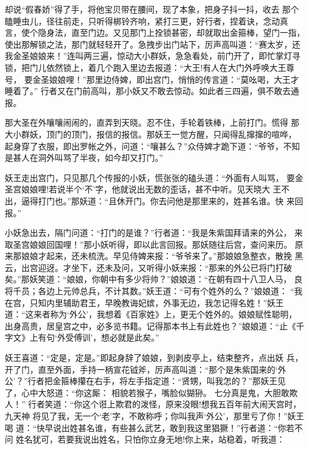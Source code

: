却说“假春娇”得了手，将他宝贝带在腰间，现了本象，把身子抖一抖，收去
那个瞌睡虫儿，径往前走，只听得梆铃齐响，紧打三更，好行者，捏着诀，念动真
言，使个隐身法，直至门边。又见那门上拴锁甚密，却就取出金箍棒，望门一指，
使出那解锁之法，那门就轻轻开了。急拽步出门站下，厉声高叫道：“赛太岁，还
我金圣娘娘来！”连叫两三遍，惊动大小群妖，急急看处，前门开了，即忙掌灯寻
锁，把门儿依然锁上，着几个跑入里边去报道：“大王!有人在大门外呼唤大王尊号，
要金圣娘娘哩！”那里边侍婢，即出宫门，悄悄的传言道：“莫吆喝，大王才睡着了。”
行者又在门前高叫，那小妖又不敢去惊动。如此者三四遍，俱不敢去通报。

那大圣在外嚷嚷闹闹的，直弄到天晓。忍不住，手轮着铁棒，上前打门。慌得
那大小群妖，顶门的顶门，报信的报信。那妖王一觉方醒，只闻得乱撺撺的喧哗，
起身穿了衣服，即出罗帐之外，问道：“嚷甚么？”众侍婢才跪下道：“爷爷，不知
是甚人在洞外叫骂了半夜，如今却又打门。”

妖王走出宫门，只见那几个传报的小妖，慌张张的磕头道：“外面有人叫骂，
要金圣宫娘娘哩!若说半个‘不’字，他就说出无数的歪话，甚不中听。见天晓大
王不出，逼得打门也。”那妖道：“且休开门。你去问他是那里来的，姓甚名谁。快
来回报。”

小妖急出去，隔门问道：“打门的是谁？”行者道：“我是朱紫国拜请来的外公，
来取圣宫娘娘回国哩！”那小妖听得，即以此言回报。那妖随往后宫，查问来历。
原来那娘娘才起来，还未梳洗。早见侍婢来报：“爷爷来了。”那娘娘急整衣，散挽
黑云，出宫迎迓。才坐下，还未及问，又听得小妖来报：“那来的外公已将门打破
矣。”那妖笑道：“娘娘，你朝中有多少将帅？”娘娘道：“在朝有四十八卫人马，
良将千员；各边上元帅总兵，不计其数。”妖王道：“可有个姓外的么？”娘娘道：
“我在宫，只知内里辅助君王，早晚教诲妃嫔，外事无边，我怎记得名姓！”妖王
道：“这来者称为‘外公’，我想着《百家姓》上，更无个姓外的。娘娘赋性聪明，
出身高贵，居皇宫之中，必多览书籍。记得那本书上有此姓也？”娘娘道：“止《千
字文》上有句‘外受傅训’，想必就是此矣。”

妖王喜道：“定是，定是。”即起身辞了娘娘，到剥皮亭上，结束整齐，点出妖
兵，开了门，直至外面，手持一柄宣花钺斧，厉声高叫道：“那个是朱紫国来的‘外
公’？”行者把金箍棒攥在右手，将左手指定道：“贤甥，叫我怎的？”那妖王见
了，心中大怒道：“你这厮：
相貌若猴子，嘴脸似猢狲。
七分真是鬼，大胆敢欺人！”
行者笑道：“你这个诳上欺君的泼怪，原来没眼!想我五百年前大闹天宫时，九天神
将见了我，无一个‘老’字，不敢称呼；你叫我声‘外公’，那里亏了你！”妖王喝
道：“快早说出姓甚名谁，有些甚么武艺，敢到我这里猖獗！”行者道：“你若不问
姓名犹可，若要我说出姓名，只怕你立身无地!你上来，站稳着，听我道：

